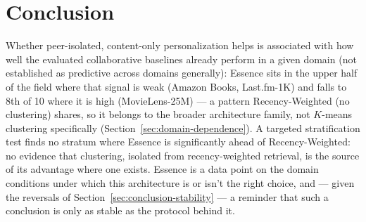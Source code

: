 \documentclass{article}
\begin{document}
\section{Conclusion}
\label{sec:conclusion}

Whether peer-isolated, content-only personalization helps is associated with how well the evaluated collaborative baselines already perform in a given domain (not established as predictive across domains generally): Essence sits in the upper half of the field where that signal is weak (Amazon Books, Last.fm-1K) and falls to 8th of 10 where it is high (MovieLens-25M) --- a pattern Recency-Weighted (no clustering) shares, so it belongs to the broader architecture family, not $K$-means clustering specifically (Section~\ref{sec:domain-dependence}). A targeted stratification test finds no stratum where Essence is significantly ahead of Recency-Weighted: no evidence that clustering, isolated from recency-weighted retrieval, is the source of its advantage where one exists. Essence is a data point on the domain conditions under which this architecture is or isn't the right choice, and --- given the reversals of Section~\ref{sec:conclusion-stability} --- a reminder that such a conclusion is only as stable as the protocol behind it.
\end{document}

